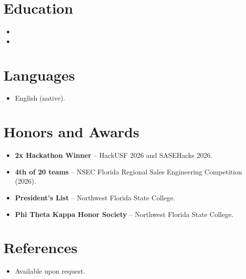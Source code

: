 \documentclass[11pt,a4paper,sans]{moderncv}
\begin{document}

\section{Education}
\vspace{1pt}
\begin{itemize}

\item{}

\vspace{3pt}

\item{}

\end{itemize}


\section{Languages}
\vspace{1pt}
\begin{itemize}
\item {English (native).}
\end{itemize}


\section{Honors and Awards}
\vspace{1pt}
\begin{itemize}
\item{\textbf{2x Hackathon Winner} -- HackUSF 2026 and SASEHacks 2026.}
\item{\textbf{4th of 20 teams} -- NSEC Florida Regional Sales Engineering Competition (2026).}
\item{\textbf{President's List} -- Northwest Florida State College.}
\item{\textbf{Phi Theta Kappa Honor Society} -- Northwest Florida State College.}
\end{itemize}


\section{References}
\vspace{1pt}
\begin{itemize}
\item{Available upon request.}
\end{itemize}
\end{document}
